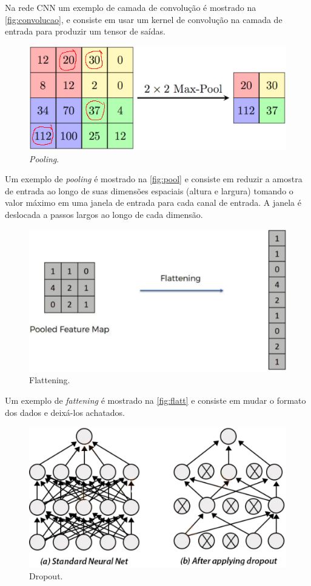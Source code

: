 \documentclass[sigconf, nonacm, screen]{acmart}
\begin{document}
Na rede CNN um exemplo de camada de convolução é mostrado na \autoref{fig:convolucao}, e consiste em usar um kernel de convolução na camada de entrada para produzir um tensor de saídas.

\begin{figure}[ht]
	\centering
	\includegraphics[width=0.9\linewidth]{img/pool}
	\caption{\textit{Pooling}.}
	\label{fig:pool}
\end{figure}

Um exemplo de \textit{pooling} é mostrado na \autoref{fig:pool} e consiste em reduzir a amostra de entrada ao longo de suas dimensões espaciais (altura e largura) tomando o valor máximo em uma janela de entrada para cada canal de entrada. A janela é deslocada a passos largos ao longo de cada dimensão.

\begin{figure}[ht]
	\centering
	\includegraphics[width=0.8\linewidth]{img/flat}
	\caption{Flattening.}
	\label{fig:flatt}
\end{figure}

Um exemplo de \textit{fattening} é mostrado na \autoref{fig:flatt} e consiste em mudar o formato dos dados e deixá-los achatados.

\begin{figure}[ht]
	\centering
	\includegraphics[width=0.9\linewidth]{img/dropout}
	\caption{Dropout.}
	\label{fig:dropout}
\end{figure}
\end{document}
